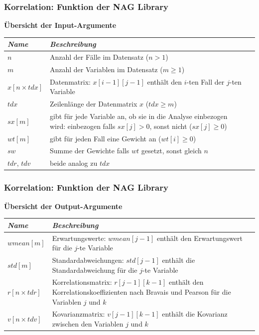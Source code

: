 \documentclass{beamer}
\begin{document}
\begin{frame}
	\frametitle{Korrelation: Funktion der NAG Library}
	
	\par \textbf{Übersicht der Input-Argumente}\\[3mm]
	
	\begin{tabular}[ht]{|l|p{9cm}l|}
  	\hline
  	\textit{Name} & \textit{Beschreibung}\\
  	\hline \hline
  	$n$ & Anzahl der Fälle im Datensatz ($n > 1$)\\ \hline
  	$m$ & Anzahl der Variablen im Datensatz ($m \geq 1$)\\ \hline
		$x[n \times tdx]$ & Datenmatrix: $x[i - 1][j - 1]$ enthält \newline
		den $i$-ten Fall der $j$-ten Variable\\ \hline
		$tdx$ & Zeilenlänge der Datenmatrix $x$ ($tdx \geq m$)\\ \hline
		$sx[m]$ & gibt für jede Variable an, ob sie in die Analyse einbezogen wird: einbezogen falls $sx[j] > 0$, sonst nicht ($sx[j] \geq 0$)\\ \hline
		$wt[m]$ & gibt für jeden Fall eine Gewicht an ($wt[i] \geq 0$)\\ \hline
		$sw$ & Summe der Gewichte falls $wt$ gesetzt, sonst gleich $n$\\ \hline
		$tdr$, $tdv$ & beide analog zu $tdx$\\
  	\hline
	\end{tabular}
\end{frame}

\begin{frame}
	\frametitle{Korrelation: Funktion der NAG Library}
	
	\par \textbf{Übersicht der Output-Argumente}\\[3mm]
	
	\begin{tabular}[ht]{|l|p{9cm}l|}
  	\hline
  	\textit{Name} & \textit{Beschreibung}\\
  	\hline \hline
  	$wmean[m]$ & Erwartungswerte: $wmean[j - 1]$ enthält \newline
  	den Erwartungswert für die $j$-te Variable\\ \hline
  	$std[m]$ & Standardabweichungen: $std[j - 1]$ enthält \newline
  	die Standardabweichung für die $j$-te Variable\\ \hline
		$r[n \times tdr]$ & Korrelationsmatrix: $r[j - 1][k - 1]$ enthält \newline
		den Korrelationskoeffizienten nach Bravais \newline
		und Pearson für die Variablen $j$ und $k$\\ \hline
		$v[n \times tdv]$ & Kovarianzmatrix: $v[j - 1][k - 1]$ enthält \newline
		die Kovarianz zwischen den Variablen $j$ und $k$\\
  	\hline
	\end{tabular}
\end{frame}
\end{document}
